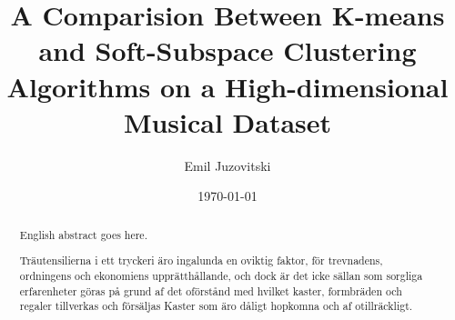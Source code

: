 \documentclass[master]{kththesis}
\title{A Comparision Between K-means and Soft-Subspace Clustering Algorithms on a High-dimensional Musical Dataset}
\author{Emil Juzovitski}
\date{\today}
\begin{document}
\frontmatter

\titlepage

\begin{abstract}
  English abstract goes here.

\end{abstract}


\begin{otherlanguage}{swedish}
  \begin{abstract}
    Träutensilierna i ett tryckeri äro ingalunda en oviktig faktor,
    för trevnadens, ordningens och ekonomiens upprätthållande, och
    dock är det icke sällan som sorgliga erfarenheter göras på grund
    af det oförstånd med hvilket kaster, formbräden och regaler
    tillverkas och försäljas Kaster som äro dåligt hopkomna och af
    otillräckligt.
  \end{abstract}
\end{otherlanguage}


\tableofcontents


\mainmatter








\printbibliography[heading=bibintoc]

\appendix


\tailmatter
\end{document}
